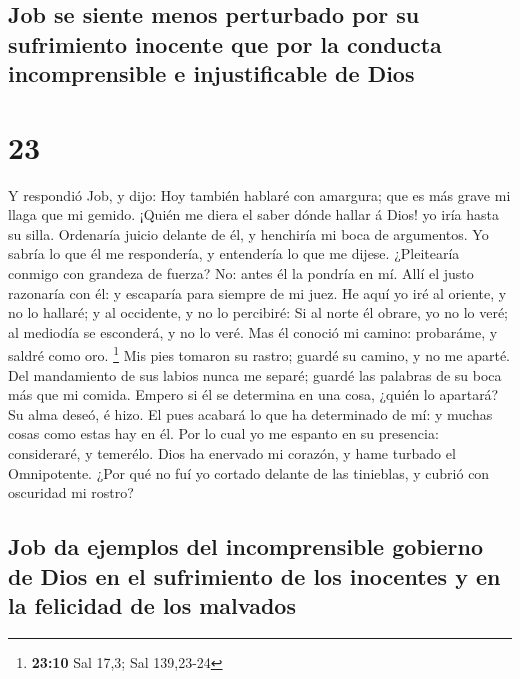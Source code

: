 \hypertarget{job-se-siente-menos-perturbado-por-su-sufrimiento-inocente-que-por-la-conducta-incomprensible-e-injustificable-de-dios}{%
\subsection{Job se siente menos perturbado por su sufrimiento inocente
que por la conducta incomprensible e injustificable de
Dios}\label{job-se-siente-menos-perturbado-por-su-sufrimiento-inocente-que-por-la-conducta-incomprensible-e-injustificable-de-dios}}

\hypertarget{section-22}{%
\section{23}\label{section-22}}

 Y respondió Job, y dijo:  Hoy también hablaré
con amargura; que es más grave mi llaga que mi gemido. 
¡Quién me diera el saber dónde hallar á Dios! yo iría hasta su silla.
 Ordenaría juicio delante de él, y henchiría mi boca de
argumentos.  Yo sabría lo que él me respondería, y
entendería lo que me dijese.  ¿Pleitearía conmigo con
grandeza de fuerza? No: antes él la pondría en mí.  Allí el
justo razonaría con él: y escaparía para siempre de mi juez.
 He aquí yo iré al oriente, y no lo hallaré; y al occidente,
y no lo percibiré:  Si al norte él obrare, yo no lo veré; al
mediodía se esconderá, y no lo veré.  Mas él conoció mi
camino: probaráme, y saldré como oro. \footnote{\textbf{23:10} Sal 17,3;
  Sal 139,23-24}  Mis pies tomaron su rastro; guardé su
camino, y no me aparté.  Del mandamiento de sus labios
nunca me separé; guardé las palabras de su boca más que mi comida.
 Empero si él se determina en una cosa, ¿quién lo apartará?
Su alma deseó, é hizo.  El pues acabará lo que ha
determinado de mí: y muchas cosas como estas hay en él. 
Por lo cual yo me espanto en su presencia: consideraré, y temerélo.
 Dios ha enervado mi corazón, y hame turbado el
Omnipotente.  ¿Por qué no fuí yo cortado delante de las
tinieblas, y cubrió con oscuridad mi rostro?

\hypertarget{job-da-ejemplos-del-incomprensible-gobierno-de-dios-en-el-sufrimiento-de-los-inocentes-y-en-la-felicidad-de-los-malvados}{%
\subsection{Job da ejemplos del incomprensible gobierno de Dios en el
sufrimiento de los inocentes y en la felicidad de los
malvados}\label{job-da-ejemplos-del-incomprensible-gobierno-de-dios-en-el-sufrimiento-de-los-inocentes-y-en-la-felicidad-de-los-malvados}}

